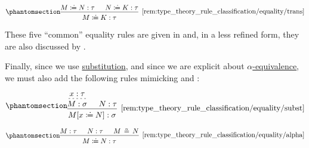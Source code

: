 \begin{remark}
\begin{thmenum}
\begin{paracol}{3}
      \begin{nthcolumn}{2}
        \ParacolAlignmentHack
        \begin{equation*}\taglabel[\ensuremath{ \coloneqq_{\logic{trans}} }]{rem:type_theory_rule_classification/equality/trans}
          \begin{prooftree}
            \hypo{ M \syndefeq N: \tau }
            \hypo{ N \syndefeq K: \tau }
            \infer2[\ref{rem:type_theory_rule_classification/equality/trans}]{ M \syndefeq K: \tau }
          \end{prooftree}
        \end{equation*}
      \end{nthcolumn}
    \end{paracol}
    \columnratio{}

    These five \enquote{common} equality rules are given in \cite[433]{UnivalentFoundationsProgram2024OctoberHoTT} and, in a less refined form, they are also discussed by .

    Finally, since we use \hyperref[def:lambda_term_substitution]{substitution}, and since we are explicit about \hyperref[def:lambda_term_alpha_equivalence]{\( \alpha \)-equivalence}, we must also add the following rules mimicking  and :
    \begin{paracol}{2}
      \begin{leftcolumn}
        \ParacolAlignmentHack
        \begin{equation*}\taglabel[\ensuremath{ \coloneqq_\mapsto }]{rem:type_theory_rule_classification/equality/subst}
          \begin{prooftree}
            \hypo{ x: \tau }
            \infer[dashed]1{ M: \sigma }

            \hypo{ N: \tau }
            \infer2[\ref{rem:type_theory_rule_classification/equality/subst}]{ M[x \syndefeq N]: \sigma }
          \end{prooftree}
        \end{equation*}
      \end{leftcolumn}

      \begin{rightcolumn}
        \ParacolAlignmentHack
        \begin{equation*}\taglabel[\ensuremath{ \coloneqq_\alpha }]{rem:type_theory_rule_classification/equality/alpha}
          \begin{prooftree}
            \hypo{ M: \tau }
            \hypo{ N: \tau }
            \hypo{ M \aequiv N }
            \infer3[\ref{rem:type_theory_rule_classification/equality/alpha}]{ M \syndefeq N: \tau }
          \end{prooftree}
        \end{equation*}
      \end{rightcolumn}
    \end{paracol}


\end{thmenum}
\end{remark}
